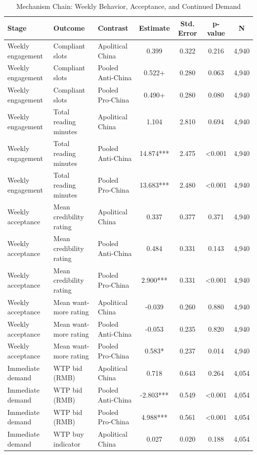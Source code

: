 \begin{table}[H]
\centering
\caption{Mechanism Chain: Weekly Behavior, Acceptance, and Continued Demand}
\label{tab:mechanism_chain}
\footnotesize
\begin{threeparttable}
\begin{tabular}{lllcccc}
\toprule
Stage & Outcome & Contrast & Estimate & Std. Error & p-value & N \\
\midrule
Weekly engagement & Compliant slots & Apolitical China & 0.399 & 0.322 & 0.216 & 4,940 \\
Weekly engagement & Compliant slots & Pooled Anti-China & 0.522+ & 0.280 & 0.063 & 4,940 \\
Weekly engagement & Compliant slots & Pooled Pro-China & 0.490+ & 0.280 & 0.080 & 4,940 \\
Weekly engagement & Total reading minutes & Apolitical China & 1.104 & 2.810 & 0.694 & 4,940 \\
Weekly engagement & Total reading minutes & Pooled Anti-China & 14.874*** & 2.475 & <0.001 & 4,940 \\
Weekly engagement & Total reading minutes & Pooled Pro-China & 13.683*** & 2.480 & <0.001 & 4,940 \\
Weekly acceptance & Mean credibility rating & Apolitical China & 0.337 & 0.377 & 0.371 & 4,940 \\
Weekly acceptance & Mean credibility rating & Pooled Anti-China & 0.484 & 0.331 & 0.143 & 4,940 \\
Weekly acceptance & Mean credibility rating & Pooled Pro-China & 2.900*** & 0.331 & <0.001 & 4,940 \\
Weekly acceptance & Mean want-more rating & Apolitical China & -0.039 & 0.260 & 0.880 & 4,940 \\
Weekly acceptance & Mean want-more rating & Pooled Anti-China & -0.053 & 0.235 & 0.820 & 4,940 \\
Weekly acceptance & Mean want-more rating & Pooled Pro-China & 0.583* & 0.237 & 0.014 & 4,940 \\
Immediate demand & WTP bid (RMB) & Apolitical China & 0.718 & 0.643 & 0.264 & 4,054 \\
Immediate demand & WTP bid (RMB) & Pooled Anti-China & -2.803*** & 0.549 & <0.001 & 4,054 \\
Immediate demand & WTP bid (RMB) & Pooled Pro-China & 4.988*** & 0.561 & <0.001 & 4,054 \\
Immediate demand & WTP buy indicator & Apolitical China & 0.027 & 0.020 & 0.188 & 4,054 \\

\end{tabular}
\end{threeparttable}
\end{table}
